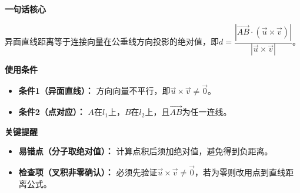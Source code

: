 \begin{summarybox}
	\textbf{\textcolor{CSummary}{一句话核心}}

	异面直线距离等于连接向量在公垂线方向投影的绝对值，即$d=\dfrac{|\overrightarrow{AB}\cdot(\vec{u}\times\vec{v})|}{|\vec{u}\times\vec{v}|}$。

	\medskip
	\textbf{\textcolor{CSummary}{使用条件}}
	\begin{itemize}[leftmargin=*, itemsep=0.5em, topsep=0.4em]
		\item \textbf{条件1（异面直线）：} 方向向量不平行，即$\vec{u}\times\vec{v}\neq\vec{0}$。
		\item \textbf{条件2（点对应）：} $A$在$l_1$上，$B$在$l_2$上，且$\overrightarrow{AB}$为任一连线。
	\end{itemize}

	\medskip
	\textbf{\textcolor{CSummary}{关键提醒}}
	\begin{itemize}[leftmargin=*, itemsep=0.5em, topsep=0.4em]
		\item \textbf{易错点（分子取绝对值）：} 计算点积后须加绝对值，避免得到负距离。
		\item \textbf{检查项（叉积非零确认）：} 必须先验证$\vec{u}\times\vec{v}\neq\vec{0}$，若为零则改用点到直线距离公式。
	\end{itemize}
\end{summarybox}
